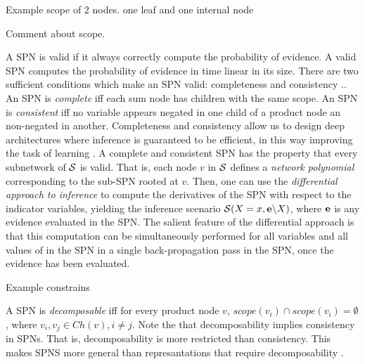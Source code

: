 \begin{example}
	Example scope of 2 nodes. one leaf and one internal node
\end{example}

Comment about scope.


A SPN is valid if it always correctly compute the probability of evidence.
A valid SPN computes the probability of evidence in time linear in its size.
There are two sufficient conditions which make an SPN valid: completeness and consistency \cite{poon2011sum}..
An SPN is \emph{complete} iff each sum node has children with the same scope.
An SPN is \emph{consistent} iff no variable appears negated in one child of a product node an non-negated in another.
Completeness and consistency allow us to design deep architectures where inference is guaranteed to be efficient, in this way improving the task of learning \cite{poon2011sum}. 
A complete and consistent SPN has the property that every subnetwork of $\cal S$ is valid.
That is, each node $v$ in $\cal S$ defines a \emph{network polynomial} \cite{poon2011sum} corresponding to the sub-SPN rooted at $v$.
Then, one can use the \emph{differential approach to inference} \cite{poon2011sum,darwiche2003differential,peharz2015theoretical} to compute the derivatives of the SPN with respect to the indicator variables, yielding the inference scenario ${\cal S}(X=x,{\bf e}\backslash X)$, where ${\bf e}$ is any evidence evaluated in the SPN.
The salient feature of the differential approach is that this computation can be simultaneously performed for all variables and all values of in the SPN in a single back-propagation pass in the SPN, once the evidence has been evaluated.


\begin{example}
Example constrains	
\end{example}

A SPN is \emph{decomposable} \cite{poon2011sum} iff for every product node $v$, $scope(v_i) \cap scope(v_i) = \emptyset$, where $v_i,v_j \in Ch(v), i\neq j$. 
Note the that decomposability implies consistency in SPNs.
That is, decomposability is more restricted than consistency.
This makes SPNS more general than represantations that require decomposability \cite{poon2011sum}.


